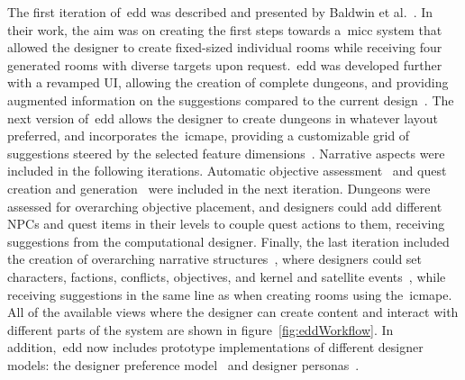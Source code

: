 The first iteration of~\acrshort{edd} was described and presented by Baldwin et al.~\cite{baldwin_mixed-initiative_2017,baldwin_towards_2017}. In their work, the aim was on creating the first steps towards a~\acrshort{micc} system that allowed the designer to create fixed-sized individual rooms while receiving four generated rooms with diverse targets upon request.~\acrshort{edd} was developed further with a revamped UI, allowing the creation of complete dungeons, and providing augmented information on the suggestions compared to the current design~\cite{alvarez_fostering_2018,alvarez_assessing_2018}. The next version of~\acrshort{edd} allows the designer to create dungeons in whatever layout preferred, and incorporates the~\acrlong{icmape}, providing a customizable grid of suggestions steered by the selected feature dimensions~\cite{alvarez_empowering_2019,alvarez_interactive_2020}. Narrative aspects were included in the following iterations. Automatic objective assessment~\cite{flodhag_make_2020} and quest creation and generation~\cite{alvarez_questgram_2021,larsson_queststories_2021} were included in the next iteration. Dungeons were assessed for overarching objective placement, and designers could add different NPCs and quest items in their levels to couple quest actions to them, receiving suggestions from the computational designer. Finally, the last iteration included the creation of overarching narrative structures~\cite{alvarez_tropetwist_2022,alvarez_story_2022}, where designers could set characters, factions, conflicts, objectives, and kernel and satellite events~\cite{aarseth_narrative_2012}, while receiving suggestions in the same line as when creating rooms using the~\acrshort{icmape}. All of the available views where the designer can create content and interact with different parts of the system are shown in figure~\ref{fig:eddWorkflow}. In addition,~\acrshort{edd} now includes prototype implementations of different designer models: the designer preference model~\cite{alvarez_exploring_2020} and designer personas~\cite{alvarez_designer_2022}.





